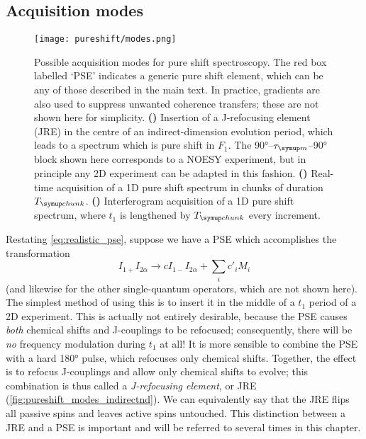 \subsection{Acquisition modes}
\label{subsec:pureshift__acquisition_modes}

\begin{figure}[htbp]
    \centering
    \texttt{[image: pureshift/modes.png]}%
    {\label{fig:pureshift_modes_indirectnd}}%
    {\label{fig:pureshift_modes_realtime}}%
    {\label{fig:pureshift_modes_interferogram}}%
    \caption[Pure shift acquisition modes]{
        Possible acquisition modes for pure shift spectroscopy.
        The red box labelled `PSE' indicates a generic pure shift element, which can be any of those described in the main text.
        In practice, gradients are also used to suppress unwanted coherence transfers; these are not shown here for simplicity.
        \textbf{()} Insertion of a J-refocusing element (JRE) in the centre of an indirect-dimension evolution period, which leads to a spectrum which is pure shift in $F_1$.
        The \ang{90}--$\taum$--\ang{90} block shown here corresponds to a NOESY experiment, but in principle any 2D experiment can be adapted in this fashion.
        \textbf{()} Real-time acquisition of a 1D pure shift spectrum in chunks of duration $\Tchunk$.
        \textbf{()} Interferogram acquisition of a 1D pure shift spectrum, where $t_1$ is lengthened by $\Tchunk$ every increment.
    }
    \label{fig:pureshift_modes}
\end{figure}

Restating \cref{eq:realistic_pse}, suppose we have a PSE which accomplishes the transformation
\begin{equation}
    \label{eq:pse_revisited}
    I_{1+}I_{2\alpha} \longrightarrow c I_{1-}I_{2\alpha} + \sum_i c'_i M_i
\end{equation}
(and likewise for the other single-quantum operators, which are not shown here).
The simplest method of using this is to insert it in the middle of a $t_1$ period of a 2D experiment.
This is actually not entirely desirable, because the PSE causes \textit{both} chemical shifts and J-couplings to be refocused; consequently, there will be \textit{no} frequency modulation during $t_1$ at all!
It is more sensible to combine the PSE with a hard \ang{180} pulse, which refocuses only chemical shifts.
Together, the effect is to refocus J-couplings and allow only chemical shifts to evolve; this combination is thus called a \textit{J-refocusing element}, or JRE (\cref{fig:pureshift_modes_indirectnd}).
We can equivalently say that the JRE flips all passive spins and leaves active spins untouched.
This distinction between a JRE and a PSE is important and will be referred to several times in this chapter.

